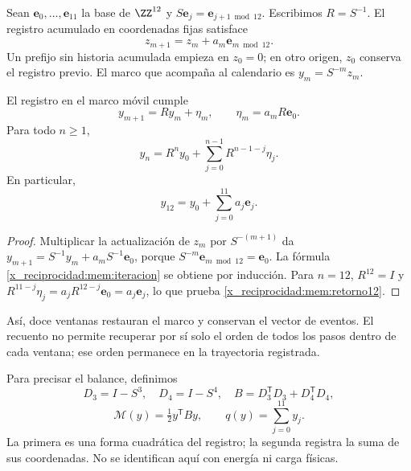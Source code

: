 Sean \(\mathbf e_0,\ldots,\mathbf e_{11}\) la base de \(\ZZ^{12}\)
y \(S\mathbf e_j=\mathbf e_{j+1\bmod12}\). Escribimos
\(R=S^{-1}\). El registro acumulado en coordenadas fijas satisface
\[
z_{m+1}=z_m+a_m\mathbf e_{m\bmod12}.
\]
Un prefijo sin historia acumulada empieza en \(z_0=0\); en otro
origen, \(z_0\) conserva el registro previo.
El marco que acompaña al calendario es \(y_m=S^{-m}z_m\).

\begin{proposition}
\label{x_reciprocidad:mem:prop-actualizacion}
El registro en el marco móvil cumple
\begin{equation}
 y_{m+1}=Ry_m+\eta_m,\qquad
 \eta_m=a_mR\mathbf e_0.
 \label{x_reciprocidad:mem:actualizacion}
\end{equation}
Para todo \(n\geq1\),
\begin{equation}
 y_n=R^ny_0+\sum_{j=0}^{n-1}R^{n-1-j}\eta_j.
 \label{x_reciprocidad:mem:iteracion}
\end{equation}
En particular,
\begin{equation}
 y_{12}=y_0+\sum_{j=0}^{11}a_j\mathbf e_j.
 \label{x_reciprocidad:mem:retorno12}
\end{equation}
\end{proposition}
\begin{proof}
Multiplicar la actualización de \(z_m\) por \(S^{-(m+1)}\) da
\(y_{m+1}=S^{-1}y_m+a_mS^{-1}\mathbf e_0\), porque
\(S^{-m}\mathbf e_{m\bmod12}=\mathbf e_0\).
La fórmula \eqref{x_reciprocidad:mem:iteracion} se obtiene por inducción.
Para \(n=12\), \(R^{12}=I\) y
\(R^{11-j}\eta_j=a_jR^{12-j}\mathbf e_0=a_j\mathbf e_j\),
lo que prueba \eqref{x_reciprocidad:mem:retorno12}.
\end{proof}

Así, doce ventanas restauran el marco y conservan el vector de eventos.
El recuento no permite recuperar por sí solo el orden de todos los pasos
dentro de cada ventana; ese orden permanece en la trayectoria registrada.

Para precisar el balance, definimos
\[
 D_3=I-S^3,\quad D_4=I-S^4,\quad
 B=D_3^{\mathsf T}D_3+D_4^{\mathsf T}D_4,
\]
\[
 \mathcal M(y)=\tfrac12y^{\mathsf T}By,
 \qquad q(y)=\sum_{j=0}^{11}y_j.
\]
La primera es una forma cuadrática del registro; la segunda registra
la suma de sus coordenadas. No se identifican aquí con energía ni carga físicas.

